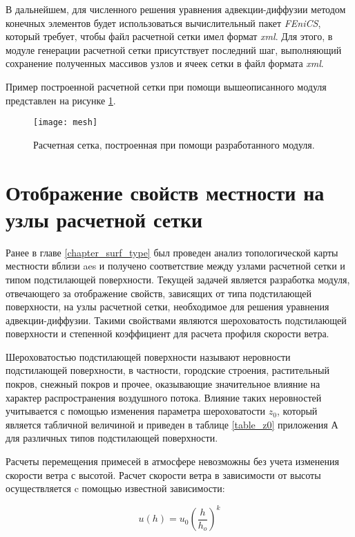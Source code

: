 В дальнейшем, для численного решения уравнения адвекции-диффузии методом конечных элементов будет использоваться 
вычислительный пакет \textit{FEniCS}, который требует, чтобы файл расчетной сетки имел формат \textit{xml}. Для этого, 
в модуле генерации расчетной сетки присутствует последний шаг, выполняющий сохранение полученных массивов узлов и ячеек 
сетки в файл формата \textit{xml}.

Пример построенной расчетной сетки при помощи вышеописанного модуля представлен на рисунке \ref{fig_mesh_img}.

\begin{figure}[ht]
	\centering
	\texttt{[image: mesh]}
	\captionsetup{justification=centering}
    \caption{Расчетная сетка, построенная при помощи разработанного модуля.}
    \label{fig_mesh_img}
\end{figure}

\section{Отображение свойств местности на узлы расчетной сетки}

Ранее в главе \ref{chapter_surf_type} был проведен анализ топологической карты местности вблизи \ac{aes} и получено 
соответствие между узлами расчетной сетки и типом подстилающей поверхности. Текущей задачей является разработка модуля, 
отвечающего за отображение свойств, зависящих от типа подстилающей поверхности, на узлы расчетной сетки, необходимое 
для решения уравнения адвекции-диффузии. Такими свойствами являются шероховатость подстилающей поверхности и степенной 
коэффициент для расчета профиля скорости ветра.

Шероховатостью подстилающей поверхности называют неровности подстилающей поверхности, в частности, городские строения, 
растительный покров, снежный покров и прочее, оказывающие значительное влияние на характер распространения воздушного 
потока. Влияние таких неровностей учитывается с помощью изменения параметра шероховатости $z_0$, который является 
табличной величиной и приведен в таблице \ref{table_z0} приложения А для различных типов подстилающей поверхности.

Расчеты перемещения примесей в атмосфере невозможны без учета изменения скорости ветра с высотой. Расчет скорости 
ветра в зависимости от высоты осуществляется c помощью известной зависимости:

\begin{equation}
    \label{eq_wind_distrib}
    u(h) = u_0 (\frac{h}{h_o}) ^ k
\end{equation}

